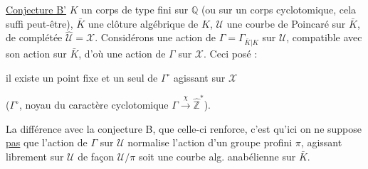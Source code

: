 \uline{Conjecture B'}  $K$ un corps de type fini sur $\mathbb{Q}$ (ou sur un corps cyclotomique, cela suffi peut-être), $\bar K$ une clôture algébrique de $K$, $\mathcal U$ une courbe de Poincaré sur $\bar K$, de complétée $\widehat{\mathcal U}=\mathcal X$. Considérons une action de $\Gamma=\Gamma_{\bar K|K}$ sur $\mathcal U$, compatible avec son action sur $\bar K$, d'où une action de $\Gamma$ sur $\mathcal X$. Ceci posé :

il existe un point fixe et un seul de $\Gamma^\circ$ agissant sur $\mathcal X$

($\Gamma^\circ$, noyau du caractère cyclotomique $\Gamma\xrightarrow{\chi}\widehat{\mathbb Z}^{\!*}$).

La différence avec la conjecture B, que celle-ci renforce, c'est qu'ici on ne suppose \uline{pas} que l'action de $\Gamma$ sur $\mathcal U$ normalise l'action d'un groupe profini $\pi$, agissant librement sur $\mathcal U$ de façon  $\mathcal U/\pi$ soit une courbe alg. anabélienne sur $\bar K$.
